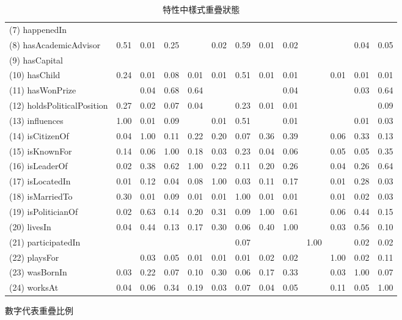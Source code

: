 \begin{table}[t]
\begin{center}
\begin{tabular}{l||*{12}{c}}
            (7) happenedIn  &    &    &    &    &    &    &    &    &    &    &    &   \\
            (8) hasAcademicAdvisor  & 0.51  & 0.01  & 0.25  &    & 0.02  & 0.59  & 0.01  & 0.02  &    &    & 0.04  & 0.05 \\
            (9) hasCapital  &    &    &    &    &    &    &    &    &    &    &    &   \\
            (10) hasChild  & 0.24  & 0.01  & 0.08  & 0.01  & 0.01  & 0.51  & 0.01  & 0.01  &    & 0.01  & 0.01  & 0.01 \\
            (11) hasWonPrize  &    & 0.04  & 0.68  & 0.64  &    &    &    & 0.04  &    &    & 0.03  & 0.64 \\
            (12) holdsPoliticalPosition  & 0.27  & 0.02  & 0.07  & 0.04  &    & 0.23  & 0.01  & 0.01  &    &    &    & 0.09 \\
            (13) influences  & 1.00  & 0.01  & 0.09  &    & 0.01  & 0.51  &    & 0.01  &    &    & 0.01  & 0.03 \\
            (14) isCitizenOf  & 0.04  & 1.00  & 0.11  & 0.22  & 0.20  & 0.07  & 0.36  & 0.39  &    & 0.06  & 0.33  & 0.13 \\
            (15) isKnownFor  & 0.14  & 0.06  & 1.00  & 0.18  & 0.03  & 0.23  & 0.04  & 0.06  &    & 0.05  & 0.05  & 0.35 \\
            (16) isLeaderOf  & 0.02  & 0.38  & 0.62  & 1.00  & 0.22  & 0.11  & 0.20  & 0.26  &    & 0.04  & 0.26  & 0.64 \\
            (17) isLocatedIn  & 0.01  & 0.12  & 0.04  & 0.08  & 1.00  & 0.03  & 0.11  & 0.17  &    & 0.01  & 0.28  & 0.03 \\
            (18) isMarriedTo  & 0.30  & 0.01  & 0.09  & 0.01  & 0.01  & 1.00  & 0.01  & 0.01  &    & 0.01  & 0.02  & 0.03 \\
            (19) isPoliticianOf  & 0.02  & 0.63  & 0.14  & 0.20  & 0.31  & 0.09  & 1.00  & 0.61  &    & 0.06  & 0.44  & 0.15 \\
            (20) livesIn  & 0.04  & 0.44  & 0.13  & 0.17  & 0.30  & 0.06  & 0.40  & 1.00  &    & 0.03  & 0.56  & 0.10 \\
            (21) participatedIn  &    &    &    &    &    & 0.07  &    &    & 1.00  &    & 0.02  & 0.02 \\
            (22) playsFor  &    & 0.03  & 0.05  & 0.01  & 0.01  & 0.01  & 0.02  & 0.02  &    & 1.00  & 0.02  & 0.11 \\
            (23) wasBornIn  & 0.03  & 0.22  & 0.07  & 0.10  & 0.30  & 0.06  & 0.17  & 0.33  &    & 0.03  & 1.00  & 0.07 \\
            (24) worksAt  & 0.04  & 0.06  & 0.34  & 0.19  & 0.03  & 0.07  & 0.04  & 0.05  &    & 0.11  & 0.05  & 1.00 \\
        \end{tabular}
        \caption{特性中樣式重疊狀態}
        \normalsize
        數字代表重疊比例
        \label{t:yago-overlap}
    \end{center}
\end{table}
